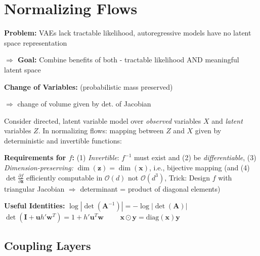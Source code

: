 \section{Normalizing Flows}

\textbf{Problem:} VAEs lack tractable likelihood, autoregressive models have no latent space representation

\textbf{$\Rightarrow$ Goal:} Combine benefits of both - tractable likelihood AND meaningful latent space

\textbf{Change of Variables:} (probabilistic mass preserved)

$\Rightarrow$ change of volume given by det. of Jacobian

Consider directed, latent variable model over \textit{observed} variables $X$ and \textit{latent}
variables $Z$. In normalizing flows: mapping between $Z$ and $X$ given by deterministic and invertible functions: 


\textbf{Requirements for $f$:} (1) \textit{Invertible}: $f^{-1}$ must exist and (2) be \textit{differentiable}, (3) \textit{Dimension-preserving:} $\dim(\mathbf{z}) = \dim(\mathbf{x})$, i.e., bijective mapping (and (4) $\det \frac{\partial f}{\partial \mathbf{z}}$ efficiently computable in $\mathcal{O}(d)$ not $\mathcal{O}(d^3)$, Trick: Design $f$ with triangular Jacobian $\Rightarrow$ determinant = product of diagonal elements)

{\small
\textbf{Useful Identities:} $\log |\det(\mathbf{A}^{-1})| = -\log |\det(\mathbf{A})|$ \\ $\det(\mathbf{I} + \mathbf{u}h'\mathbf{w}^T) = 1 + h'\mathbf{u}^T\mathbf{w}$ $\quad \quad \mathbf{x} \odot \mathbf{y} = \text{diag}(\mathbf{x})\mathbf{y}$}

\subsection{Coupling Layers}


